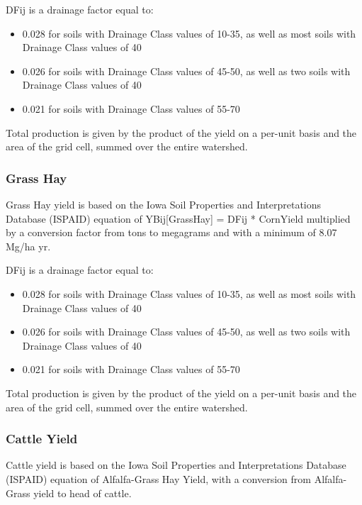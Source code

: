 \documentclass[11pt]{article}
\begin{document}
DFij is a drainage factor equal to:
\begin{itemize}

\item 0.028 for soils with Drainage Class values of 10-35, as well as most soils with Drainage Class values of 40
\item 0.026 for soils with Drainage Class values of 45-50, as well as two soils with Drainage Class values of 40
\item 0.021 for soils with Drainage Class values of 55-70

\end{itemize}

Total production is given by the product of the yield on a per-unit basis and the area of the grid cell, summed over the entire watershed. 

\subsubsection{Grass Hay}
Grass Hay yield is based on the Iowa Soil Properties and Interpretations Database (ISPAID) equation of YBij[GrassHay] = DFij * CornYield multiplied by a conversion factor from tons to megagrams and with a minimum of 8.07 Mg/ha yr.\cite{43} 

DFij is a drainage factor equal to:

\begin{itemize}

\item 0.028 for soils with Drainage Class values of 10-35, as well as most soils with Drainage Class values of 40
\item 0.026 for soils with Drainage Class values of 45-50, as well as two soils with Drainage Class values of 40
\item 0.021 for soils with Drainage Class values of 55-70

\end{itemize}

Total production is given by the product of the yield on a per-unit basis and the area of the grid cell, summed over the entire watershed. 

\subsubsection{Cattle Yield}
Cattle yield is based on the Iowa Soil Properties and Interpretations Database (ISPAID) equation of Alfalfa-Grass Hay Yield, with a conversion from Alfalfa-Grass yield to head of cattle.
\end{document}
